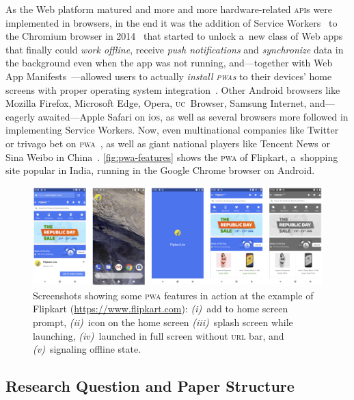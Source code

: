 \documentclass[sigconf]{acmart}
\begin{document}
As the Web platform matured and more and more
hardware-related \textsc{api}s were implemented in browsers,
in the end it was the addition of Service Workers~\cite{russell2017serviceworkers}
to the Chromium browser in 2014~\cite{cooney2014chromium} that started to unlock a~new class of Web apps
that finally could \emph{work offline}, receive \emph{push notifications}
and \emph{synchronize} data in the background even when the app was not running,
and---together with Web App Manifests~\cite{caceres2017manifest}---allowed
users to actually \emph{install \textsc{pwa}s} to their devices' home screens
with proper operating system integration~\cite{kinlan2017a2hs}.
Other Android browsers like Mozilla Firefox, Microsoft Edge, Opera, \textsc{uc}~Browser, Samsung Internet,
and---eagerly awaited---Apple Safari on i\textsc{os},
as well as several browsers more followed in implementing Service Workers.
Now, even multinational companies like Twitter
or trivago bet on \textsc{pwa}~\cite{gallagher2017twitterlite,twg2017trivago},
as well as giant national players like Tencent News or Sina Weibo in China~\cite{zhu2017pwa}.
\autoref{fig:pwa-features} shows the \textsc{pwa} of Flipkart, a~shopping site popular in India,
running in the Google Chrome browser on Android.

\begin{figure}[hbt]
  \centering
  \includegraphics[width=\columnwidth]{pwa-features}
  \caption[Screenshots showing some \textsc{pwa} features]{
    Screenshots showing some \textsc{pwa} features in action
    at the example of Flipkart (\url{https://www.flipkart.com}):
    \emph{(i)}~add to home screen prompt, \emph{(ii)}~icon on the home screen
    \emph{(iii)}~splash screen while launching,
    \emph{(iv)}~launched in full screen without \textsc{url} bar, and
    \emph{(v)}~signaling offline state.}
  \label{fig:pwa-features}
\end{figure}

\subsection{Research Question and Paper Structure}
\end{document}

